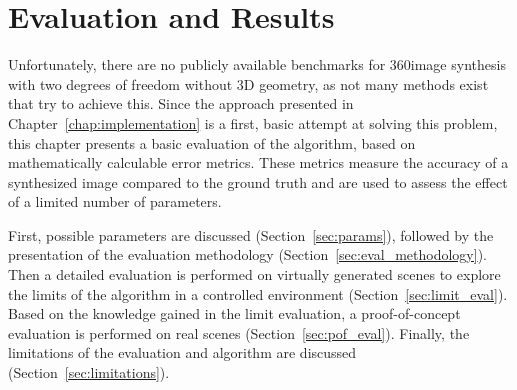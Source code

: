 \chapter{Evaluation and Results} \label{chap:evaluation}
Unfortunately, there are no publicly available benchmarks for 360\degree image synthesis with two degrees of freedom without 3D geometry, as not many methods exist that try to achieve this. Since the approach presented in Chapter~\ref{chap:implementation} is a first, basic attempt at solving this problem, this chapter presents a basic evaluation of the algorithm, based on mathematically calculable error metrics. These metrics measure the accuracy of a synthesized image compared to the ground truth and are used to assess the effect of a limited number of parameters.

First, possible parameters are discussed (Section~\ref{sec:params}), followed by the presentation of the evaluation methodology (Section~\ref{sec:eval_methodology}). Then a detailed evaluation is performed on virtually generated scenes to explore the limits of the algorithm in a controlled environment (Section~\ref{sec:limit_eval}). Based on the knowledge gained in the limit evaluation, a proof-of-concept evaluation is performed on real scenes (Section~\ref{sec:pof_eval}). Finally, the limitations of the evaluation and algorithm are discussed (Section~\ref{sec:limitations}).



